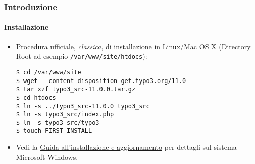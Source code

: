 %

\begin{frame}[fragile]
	\frametitle{Introduzione}
	\framesubtitle{Installazione}


	\begin{itemize}
		\item Procedura ufficiale, \textit{classica}, di installazione in Linux/Mac OS X\newline
			(Directory Root ad esempio \texttt{/var/www/site/htdocs}):
\begin{lstlisting}
$ cd /var/www/site
$ wget --content-disposition get.typo3.org/11.0
$ tar xzf typo3_src-11.0.0.tar.gz
$ cd htdocs
$ ln -s ../typo3_src-11.0.0 typo3_src
$ ln -s typo3_src/index.php
$ ln -s typo3_src/typo3
$ touch FIRST_INSTALL
\end{lstlisting}

		\item Vedi la \href{https://docs.typo3.org/m/typo3/guide-installation/master/en-us/}{Guida all'installazione e aggiornamento}
			per dettagli sul sistema Microsoft Windows.

	\end{itemize}
\end{frame}

